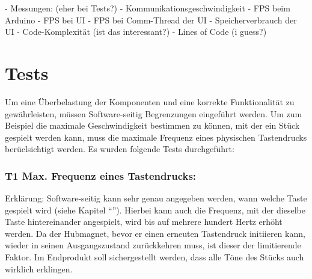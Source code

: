 - Messungen: (eher bei Tests?) \newline
	- Kommunikationsgeschwindigkeit \newline
	- FPS beim Arduino \newline
	- FPS bei UI \newline
	- FPS bei Comm-Thread der UI \newline
	- Speicherverbrauch der UI \newline
	- Code-Komplexität (ist das interessant?) \newline
	- Lines of Code (i guess?) \newline



\section{Tests} \label{ergebnisse-tests}

Um eine Überbelastung der Komponenten und eine korrekte Funktionalität zu gewährleisten, müssen Software-seitig Begrenzungen eingeführt werden.
Um zum Beispiel die maximale Geschwindigkeit bestimmen zu können, mit der ein Stück gespielt werden kann, muss die maximale Frequenz eines physischen Tastendrucks berüclsichtigt werden.
Es wurden folgende Tests durchgeführt:

\subsubsection{T1 Max. Frequenz eines Tastendrucks:}

Erklärung: Software-seitig kann sehr genau angegeben werden, wann welche Taste gespielt wird (siehe Kapitel \enquote{}).
Hierbei kann auch die Frequenz, mit der dieselbe Taste hintereinander angespielt, wird bis auf mehrere hundert Hertz erhöht werden.
Da der Hubmagnet, bevor er einen erneuten Tastendruck initiieren kann, wieder in seinen Ausgangszustand zurückkehren muss, ist dieser der limitierende Faktor.
Im Endprodukt soll sichergestellt werden, dass alle Töne des Stücks auch wirklich erklingen. %


